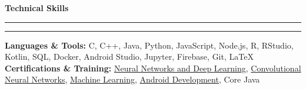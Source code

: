 \documentclass[11pt]{article}
\begin{document}
    \vspace{2pt}
    \textbf{\large{Technical Skills}}
    	\vspace{5pt}
    	\hrule \hrule
    	\vspace{4pt}
    	\textbf{Languages \& Tools:} C, C++, Java, Python, JavaScript, Node.js, R, RStudio, Kotlin, SQL, Docker, Android Studio, Jupyter, Firebase, Git, \LaTeX\\
        \textbf{Certifications \& Training:} \href{https://drive.google.com/file/d/1mir_TBy9GinXpSU3H-8LyYn68GkcM62f/view?usp=sharing}{Neural Networks and Deep Learning}, \href{https://drive.google.com/file/d/18cQMPfNLtvY4-Ozh7hZnUIDKYh9tRYPG/view?usp=sharing}{Convolutional Neural Networks}, \href{https://drive.google.com/file/d/13L4JKQ1pwLG9YVevPVZLNRLUeZWGkvyU/view?usp=sharing}{Machine Learning}, \href{https://drive.google.com/file/d/1Hp5dvhNVz9FvjQ6Y4vIVZldKpb8m8LCp/view?usp=sharing}{Android Development}, Core Java\\
   
\end{document}
